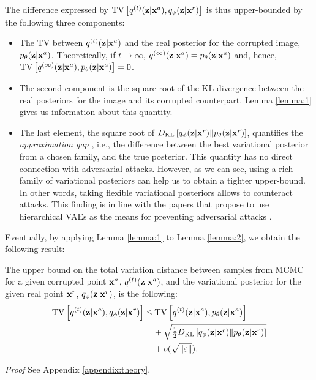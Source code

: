 The difference expressed by ${\mathrm{TV}\left[q^{(t)}({\mathbf{z}}|{\mathbf{x}}^a) ,q_{\phi}({\mathbf{z}}|{\mathbf{x}}^r) \right]}$ is thus upper-bounded by the following three components:
\begin{itemize}
    \item The $\mathrm{TV}$ between  $q^{(t)}({\mathbf{z}}|{\mathbf{x}}^a)$ and the real posterior for the corrupted image, $p_{\theta}({\mathbf{z}}|{\mathbf{x}}^a)$. Theoretically, if $t \rightarrow \infty$, $q^{(\infty)}({\mathbf{z}}|{\mathbf{x}}^a) = p_{\theta}({\mathbf{z}}|{\mathbf{x}}^a)$ and, hence, ${\mathrm{TV}\left[ q^{(\infty)}({\mathbf{z}}|{\mathbf{x}}^a) ,p_{\theta}({\mathbf{z}}|{\mathbf{x}}^a)  \right]} = 0$.
    \item The second component is the square root of the KL-divergence between the real posteriors for the image and its corrupted counterpart. Lemma \ref{lemma:1} gives us information about this quantity.
    \item The last element, the square root of $D_{\mathrm{KL}}\left[ q_{\phi}({\mathbf{z}}|{\mathbf{x}}^r)\|p_{\theta}({\mathbf{z}}|{\mathbf{x}}^r)\right]$, quantifies the \textit{approximation gap} \cite{cremer2018inference}, i.e., the difference between the best variational posterior from a chosen family, and the true posterior. This quantity has no direct connection with adversarial attacks. However, as we can see, using a rich family of variational posteriors can help us to obtain a tighter upper-bound. In other words, taking flexible variational posteriors allows to counteract attacks. This finding is in line with the papers that propose to use hierarchical VAEs as the means for preventing adversarial attacks \cite{Willetts2019-mu}.
\end{itemize}

Eventually, by applying Lemma \ref{lemma:1} to Lemma \ref{lemma:2}, we obtain the following result:

\begin{theorem}\label{theorem:main}
The upper bound on the total variation distance between samples from MCMC for a given corrupted point ${\mathbf{x}}^a$, $q^{(t)}({\mathbf{z}}|{\mathbf{x}}^a)$, and the variational posterior for the given real point ${\mathbf{x}}^r$, $q_{\phi}({\mathbf{z}}|{\mathbf{x}}^r)$, is the following:
\begin{align} \label{eq:theorem_1_main}
    \TV{ q^{(t)}(\rvz|\rvx^a)}{q_{\phi}(\rvz|\rvx^r) }
\leq 
&  \,\TV{ q^{(t)}(\rvz|\rvx^a)}{p_{\theta}(\rvz|\rvx^a) } \notag \\
    &+ 
   \sqrt{\tfrac12  \KL{ q_{\phi}(\rvz|\rvx^r) }{ p_{\theta}(\rvz|\rvx^r)} } \notag\\
   &+ o(\sqrt{\|\varepsilon\|}).
\end{align}
\end{theorem}
\textit{Proof} See Appendix \ref{appendix:theory}.


